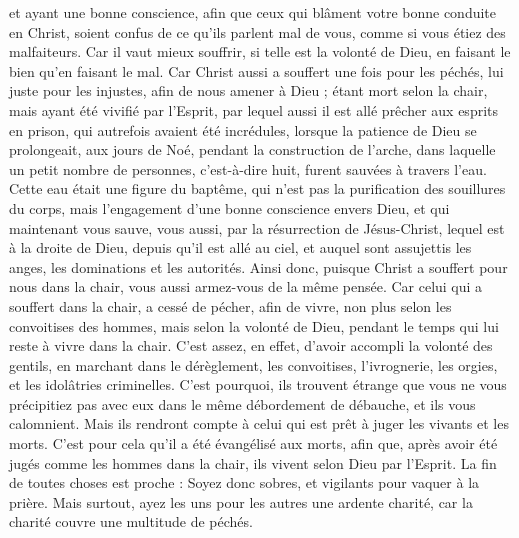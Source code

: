 \begin{multicols}{2}
et ayant une bonne conscience, afin que ceux qui blâment votre bonne conduite en Christ, soient confus de ce qu'ils parlent mal de vous, comme si vous étiez des malfaiteurs.
Car il vaut mieux souffrir, si telle est la volonté de Dieu, en faisant le bien qu’en faisant le mal.
Car Christ aussi a souffert une fois pour les péchés, lui juste pour les injustes, afin de nous amener à Dieu ; étant mort selon la chair, mais ayant été vivifié par l'Esprit,
par lequel aussi il est allé prêcher aux esprits en prison{},
qui autrefois avaient été incrédules, lorsque la patience de Dieu se prolongeait, aux jours de Noé, pendant la construction de l'arche, dans laquelle un petit nombre de personnes, c’est-à-dire huit, furent sauvées à travers l'eau.
Cette eau était une figure du baptême, qui n’est pas la purification des souillures du corps, mais l’engagement d’une bonne conscience envers Dieu, et qui maintenant vous sauve, vous aussi, par la résurrection de Jésus-Christ,
lequel est à la droite de Dieu, depuis qu’il est allé au ciel, et auquel sont assujettis les anges, les dominations et les autorités.
\VerseOne{}Ainsi donc, puisque Christ a souffert pour nous dans la chair, vous aussi armez-vous de la même pensée. Car celui qui a souffert dans la chair, a cessé de pécher,
afin de vivre, non plus selon les convoitises des hommes, mais selon la volonté de Dieu, pendant le temps qui lui reste à vivre dans la chair.
C’est assez, en effet, d’avoir accompli la volonté des gentils, en marchant dans le dérèglement, les convoitises, l’ivrognerie, les orgies, et les idolâtries criminelles.
C’est pourquoi, ils trouvent étrange que vous ne vous précipitiez pas avec eux dans le même débordement de débauche, et ils vous calomnient.
Mais ils rendront compte à celui qui est prêt à juger les vivants et les morts.
C’est pour cela qu'il a été évangélisé aux morts, afin que, après avoir été jugés comme les hommes dans la chair, ils vivent selon Dieu par l'Esprit.
La fin de toutes choses est proche : Soyez donc sobres, et vigilants pour vaquer à la prière.
Mais surtout, ayez les uns pour les autres une ardente charité, car la charité couvre une multitude de péchés.

\end{multicols}
